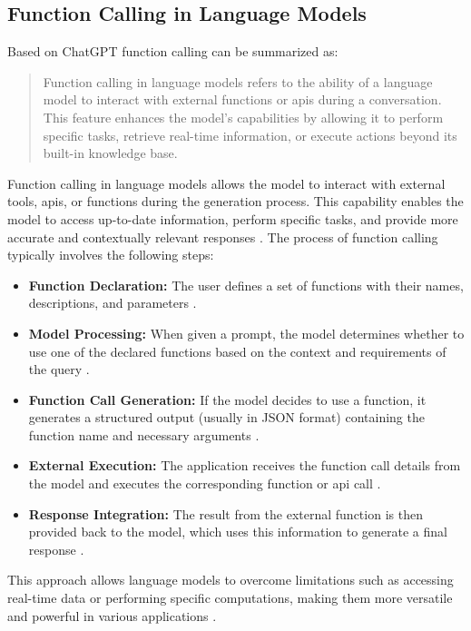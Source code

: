 \newpage
\subsection{Function Calling in Language Models}
Based on ChatGPT \cite{openai2024function-chatgpt} function calling can be summarized as:

\begin{quote}
Function calling in language models refers to the ability of a language model to interact with external functions or \glspl{api} during a conversation. This feature enhances the model's capabilities by allowing it to perform specific tasks, retrieve real-time information, or execute actions beyond its built-in knowledge base.
\end{quote} 

\noindent
Function calling in language models allows the model to interact with external tools, \glspl{api}, or functions during the generation process. This capability enables the model to access up-to-date information, perform specific tasks, and provide more accurate and contextually relevant responses \cite{mistral2024function, openai2024function-article, google2024function}.
The process of function calling typically involves the following steps:

\begin{itemize}
\item \textbf{Function Declaration:} The user defines a set of functions with their names, descriptions, and parameters \cite{mistral2024function}.

\item \textbf{Model Processing:} When given a prompt, the model determines whether to use one of the declared functions based on the context and requirements of the query \cite{mistral2024function, openai2024function-article}.

\item \textbf{Function Call Generation:} If the model decides to use a function, it generates a structured output (usually in JSON format) containing the function name and necessary arguments \cite{mistral2024function, openai2024function-article}.

\item \textbf{External Execution:} The application receives the function call details from the model and executes the corresponding function or \gls{api} call \cite{mistral2024function, google2024function}.

\item \textbf{Response Integration:} The result from the external function is then provided back to the model, which uses this information to generate a final response \cite{mistral2024function, google2024function}.
\end{itemize}
This approach allows language models to overcome limitations such as accessing real-time data or performing specific computations, making them more versatile and powerful in various applications \cite{google2024function}.

